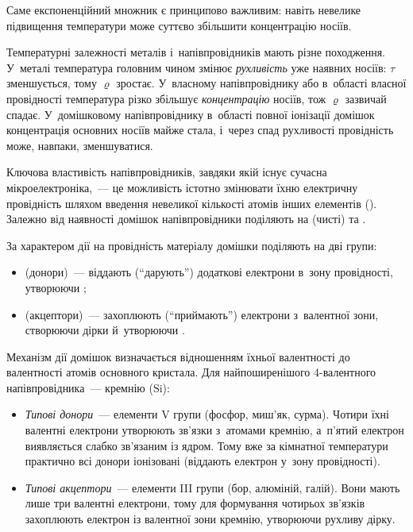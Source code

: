 Саме експоненційний множник є принципово важливим: навіть невелике підвищення температури
може суттєво збільшити концентрацію носіїв.

\begin{Attention}
	Температурні залежності металів і~напівпровідників мають різне походження.
	У~металі температура головним чином змінює \emph{рухливість} уже наявних носіїв:
	$\tau$ зменшується, тому $\varrho$ зростає. У~власному напівпровіднику або в~області
	власної провідності температура різко збільшує \emph{концентрацію} носіїв, тож
	$\varrho$ зазвичай спадає. У~домішковому напівпровіднику в~області повної іонізації
	домішок концентрація основних носіїв майже стала, і~через спад рухливості провідність
	може, навпаки, зменшуватися.
\end{Attention}

Ключова властивість напівпровідників, завдяки якій існує сучасна мікроелектроніка,~--- це
можливість істотно змінювати їхню електричну провідність шляхом введення невеликої
кількості атомів інших елементів (). Залежно від наявності домішок
напівпровідники поділяють на  (чисті) та .

За характером дії на провідність матеріалу домішки поділяють на дві групи:
\begin{itemize}
	\item {} (донори)~--- віддають (\enquote{дарують}) додаткові електрони
	  в~зону провідності, утворюючи ;
	\item {} (акцептори)~--- захоплюють (\enquote{приймають}) електрони
	  з~валентної зони, створюючи дірки й~утворюючи .
\end{itemize}

Механізм дії домішок визначається відношенням їхньої валентності до валентності атомів
основного кристала. Для найпоширенішого 4-валентного напівпровідника~--- кремнію
($\text{Si}$):
\begin{itemize}
	\item \emph{Типові донори}~--- елементи V групи (фосфор, миш'як, сурма). Чотири їхні
	  валентні електрони утворюють зв'язки з~атомами кремнію, а~п'ятий електрон
	  виявляється слабко зв'язаним із ядром. Тому вже за кімнатної температури практично
	  всі донори іонізовані (віддають електрон у~зону провідності).
	\item \emph{Типові акцептори}~--- елементи III групи (бор, алюміній, галій). Вони
	  мають лише три валентні електрони, тому для формування чотирьох зв'язків захоплюють
	  електрон із валентної зони кремнію, утворюючи рухливу дірку.
\end{itemize}

